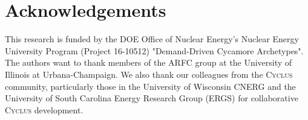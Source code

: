\documentclass{anstrans}
\newcommand{\Cyclus}{\textsc{Cyclus}\xspace}%
\begin{document}
\nopagebreak
\section{Acknowledgements}
This research is funded by the \gls{DOE} Office of 
Nuclear Energy's Nuclear Energy University Program (Project 16-10512) 
"Demand-Driven Cycamore Archetypes". The authors want to thank 
members of the \gls{ARFC} group at the University of Illinois at 
Urbana-Champaign. 
We also thank our colleagues from the \Cyclus community, 
particularly those in the University of Wisconsin 
\gls{CNERG} and the University of South Carolina Energy Research 
Group (ERGS) for collaborative \Cyclus development.



\end{document}
